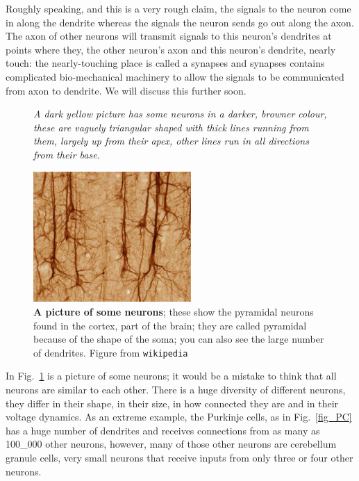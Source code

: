 \documentclass[12pt]{article}
\begin{document}
Roughly speaking, and this is a very rough claim, the signals to the
neuron come in along the dendrite whereas the signals the neuron sends
go out along the axon. The axon of other neurons will transmit signals
to this neuron's dendrites at points where they, the other neuron's
axon and this neuron's dendrite, nearly touch: the nearly-touching
place is called a synapses and synapses contains complicated
bio-mechanical machinery to allow the signals to be communicated from
axon to dendrite. We will discuss this further soon.

\begin{figure}[tbhp]
{\textsl{A dark yellow picture has some neurons in a darker, browner colour, these are vaguely triangular shaped with thick lines running from them, largely up from their apex, other lines run in all directions from their base.}}
{
  \begin{center}
  \includegraphics[width=6cm]{Smi32neuron.jpg}
  \end{center}
  }
  \caption{\textbf{A picture of some neurons}; these show the
    pyramidal neurons found in the cortex, part of the brain; they are
    called pyramidal because of the shape of the soma; you can also see the large number of dendrites. Figure from
    \texttt{wikipedia}\label{fig_real_neuron}}
\end{figure}

In Fig.~\ref{fig_real_neuron} is a picture of some neurons; it would
be a mistake to think that all neurons are similar to each
other. There is a huge diversity of different neurons, they differ in
their shape, in their size, in how connected they are and in their
voltage dynamics. As an extreme example, the Purkinje cells, as in
Fig.~\ref{fig_PC} has a huge number of dendrites and receives
connections from as many as 100\_000 other neurons, however, many of
those other neurons are cerebellum granule cells, very small neurons
that receive inputs from only three or four other neurons. 
\end{document}
